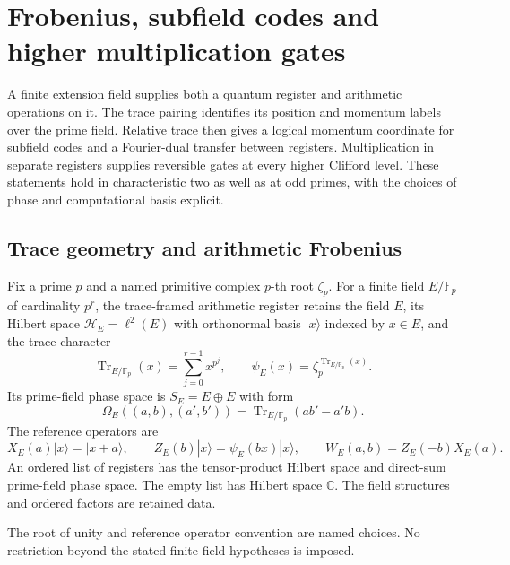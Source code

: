 \clearpage
\section{Frobenius, subfield codes and higher multiplication gates}
\label{sec:frobenius-hierarchy-algebra}

A finite extension field supplies both a quantum register and arithmetic
operations on it.  The trace pairing identifies its position and momentum
labels over the prime field.  Relative trace then gives a logical momentum
coordinate for subfield codes and a Fourier-dual transfer between registers.
Multiplication in separate registers supplies reversible gates at every
higher Clifford level.  These statements hold in characteristic two as well
as at odd primes, with the choices of phase and computational basis explicit.

\subsection{Trace geometry and arithmetic Frobenius}

\begin{definition}
Fix a prime $p$ and a named primitive complex $p$-th root $\zeta_p$.
For a finite field $E/\mathbb F_p$ of cardinality $p^r$, the trace-framed
arithmetic register retains the field $E$, its Hilbert space
$\mathcal H_E=\ell^2(E)$ with orthonormal basis $|x\rangle$ indexed by
$x\in E$, and the trace character
\[
 \operatorname{Tr}_{E/\mathbb F_p}(x)=\sum_{j=0}^{r-1}x^{p^j},
 \qquad
 \psi_E(x)=\zeta_p^{\operatorname{Tr}_{E/\mathbb F_p}(x)}.
\]
Its prime-field phase space is $S_E=E\oplus E$ with form
\[
 \Omega_E((a,b),(a',b'))=
 \operatorname{Tr}_{E/\mathbb F_p}(ab'-a'b).
\]
The reference operators are
\[
 X_E(a)|x\rangle=|x+a\rangle,\qquad
 Z_E(b)|x\rangle=\psi_E(bx)|x\rangle,\qquad
 W_E(a,b)=Z_E(-b)X_E(a).
\]
An ordered list of registers has the tensor-product Hilbert space and
direct-sum prime-field phase space.  The empty list has Hilbert space
$\mathbb C$.  The field structures and ordered factors are retained data.
\end{definition}
\begin{scope}
The root of unity and reference operator convention are named choices.
No restriction beyond the stated finite-field hypotheses is imposed.
\end{scope}

